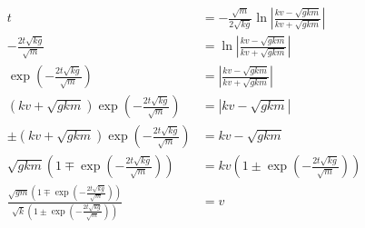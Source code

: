 \begin{align*}
    t                                                                                                                                                           & = - \frac{\sqrt m}{2\sqrt {kg}} \ln\left|\frac{kv-\sqrt{gkm}}{kv+\sqrt{gkm}}\right| \\
    -\frac{2t\sqrt {kg}}{\sqrt m}                                                                                                                               & = \ln\left|\frac{kv-\sqrt{gkm}}{kv+\sqrt{gkm}}\right|                               \\
    \exp\left(-\frac{2t\sqrt {kg}}{\sqrt m}\right)                                                                                                              & = \left|\frac{kv-\sqrt{gkm}}{kv+\sqrt{gkm}}\right|                                  \\
    (kv+\sqrt{gkm})\exp\left(-\frac{2t\sqrt {kg}}{\sqrt m}\right)                                                                                               & = \left|kv-\sqrt{gkm}\right|                                                        \\
    \pm(kv+\sqrt{gkm})\exp\left(-\frac{2t\sqrt {kg}}{\sqrt m}\right)                                                                                            & = kv-\sqrt{gkm}                                                                     \\
    \sqrt{gkm}\left(1 \mp \exp\left(-\frac{2t\sqrt {kg}}{\sqrt m}\right)\right)                                                                                 & = kv\left(1 \pm \exp\left(-\frac{2t\sqrt {kg}}{\sqrt m}\right)\right)               \\
    \frac{\sqrt{gm}\left(1 \mp \exp\left(-\frac{2t\sqrt {kg}}{\sqrt m}\right)\right)}{\sqrt k\left(1 \pm \exp\left(-\frac{2t\sqrt {kg}}{\sqrt m}\right)\right)} & = v                                                                                 \\
\end{align*}

